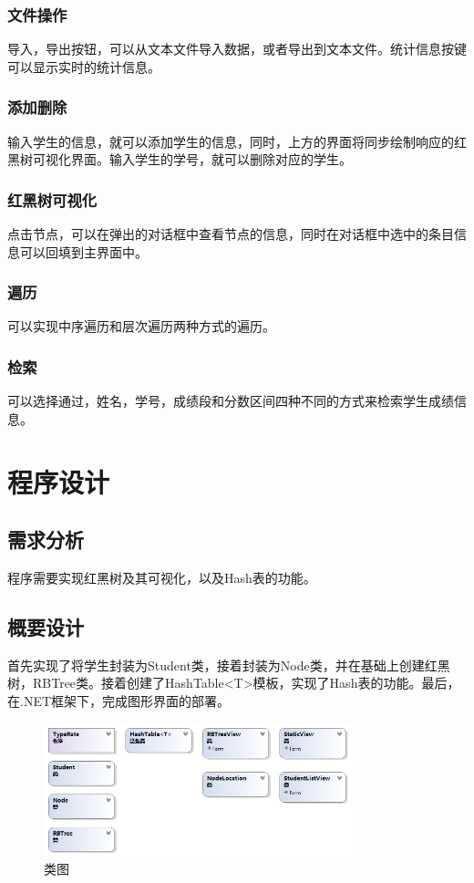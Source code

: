 \documentclass[12pt,a4paper]{article}
\begin{document}
\subsubsection{文件操作}
导入，导出按钮，可以从文本文件导入数据，或者导出到文本文件。统计信息按键可以显示实时的统计信息。
\subsubsection{添加删除}
输入学生的信息，就可以添加学生的信息，同时，上方的界面将同步绘制响应的红黑树可视化界面。输入学生的学号，就可以删除对应的学生。
\subsubsection{红黑树可视化}
点击节点，可以在弹出的对话框中查看节点的信息，同时在对话框中选中的条目信息可以回填到主界面中。
\subsubsection{遍历}
可以实现中序遍历和层次遍历两种方式的遍历。
\subsubsection{检索}
可以选择通过，姓名，学号，成绩段和分数区间四种不同的方式来检索学生成绩信息。
\section{程序设计}
\subsection{需求分析}
程序需要实现红黑树及其可视化，以及Hash表的功能。
\subsection{概要设计}
首先实现了将学生封装为Student类，接着封装为Node类，并在基础上创建红黑树，RBTree类。接着创建了HashTable<T>模板，实现了Hash表的功能。最后，在.NET框架下，完成图形界面的部署。
\begin{figure}[H]
\centering
\includegraphics[width=0.8\textwidth]{1.png}
\caption{类图} 
\end{figure}
\end{document}
